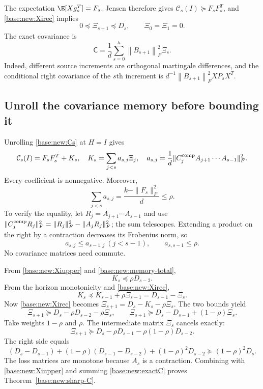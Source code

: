 \documentclass[11pt,oneside,openany,a4paper]{book}
\numberwithin{equation}{chapter}
\theoremstyle{definition}
\theoremstyle{remark}
\newcommand{\F}[1]{\left\lVert#1\right\rVert_F}
\newcommand{\Cov}{\mathsf C}\newcommand{\Loss}{\mathsf L}\newcommand{\Fil}{\mathcal F}
\begin{document}
The expectation $\E[Xg_s^T]=F_s$. Jensen therefore gives
$\mathcal C_s(I)\succeq F_sF_s^T$, and \eqref{base:new:Xirec} implies
\begin{equation}\label{base:new:Xiupper}
 0\preceq\Xi_{s+1}\preceq D_s,
 \qquad\Xi_0=\Xi_1=0.
\end{equation}
The exact covariance is
\begin{equation}\label{base:new:exactC}
 \Cov=\frac1d\sum_{s=0}^{h}\F{B_{s+1}}^2\Xi_s.
\end{equation}
Indeed, different source increments are orthogonal martingale differences, and the conditional right covariance of the $s$th increment is
$d^{-1}\F{B_{s+1}}^2XP_sX^T$.

\subsection{Unroll the covariance memory before bounding it}
Unrolling \eqref{base:new:Cs} at $H=I$ gives
\begin{equation}\label{base:new:memory}
 \mathcal C_s(I)=F_sF_s^T+K_s,\quad
 K_s=\sum_{j<s}a_{s,j}\Xi_j,\quad
 a_{s,j}=\frac1d\|C_j^{\rm comp}A_{j+1}\cdots A_{s-1}\|_F^2.
\end{equation}
Every coefficient is nonnegative. Moreover,
\begin{equation}\label{base:new:memory-total}
 \sum_{j<s}a_{s,j}=\frac{k-\|F_s\|_F^2}{d}\le\rho.
\end{equation}
To verify the equality, let $R_j=A_{j+1}\cdots A_{s-1}$ and use
$\|C_j^{\rm comp}R_j\|_F^2=\|R_j\|_F^2-\|A_jR_j\|_F^2$; the sum telescopes. Extending a product on the right by a contraction decreases its Frobenius norm, so
\[
 a_{s,j}\le a_{s-1,j}\ (j<s-1),\qquad a_{s,s-1}\le\rho.
\]
No covariance matrices need commute.

From \eqref{base:new:Xiupper} and \eqref{base:new:memory-total},
\begin{equation}\label{base:new:memory-bd1}
 K_s\preceq\rho D_{s-2}.
\end{equation}
From the horizon monotonicity and \eqref{base:new:Xirec},
\begin{equation}\label{base:new:memory-bd2}
 K_s\preceq K_{s-1}+\rho\Xi_{s-1}=D_{s-1}-\Xi_s.
\end{equation}
Now \eqref{base:new:Xirec} becomes $\Xi_{s+1}=D_s-K_s-\rho\Xi_s$. The two bounds yield
\[
 \Xi_{s+1}\succeq D_s-\rho D_{s-2}-\rho\Xi_s,
 \qquad
 \Xi_{s+1}\succeq D_s-D_{s-1}+(1-\rho)\Xi_s.
\]
Take weights $1-\rho$ and $\rho$. The intermediate matrix $\Xi_s$ cancels exactly:
\begin{equation}\label{base:new:age-Xi}
 \Xi_{s+1}\succeq D_s-\rho D_{s-1}-\rho(1-\rho)D_{s-2}.
\end{equation}
The right side equals
\[
 (D_s-D_{s-1})+(1-\rho)(D_{s-1}-D_{s-2})+(1-\rho)^2D_{s-2}
 \succeq(1-\rho)^2D_s.
\]
The loss matrices are monotone because $A_s$ is a contraction. Combining with \eqref{base:new:Xiupper} and summing \eqref{base:new:exactC} proves Theorem~\ref{base:new:sharp-C}.
\end{document}
